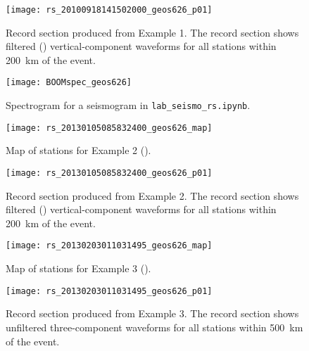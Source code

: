 \documentclass[11pt,titlepage,fleqn]{article}
\newcommand{\tfile}{{\tt lab\_seismo\_rs.ipynb}}
\begin{document}
\clearpage\pagebreak
\begin{figure}
\hspace{-1.25cm}
\texttt{[image: rs\_20100918141502000\_geos626\_p01]}
\caption[]
{{
Record section produced from Example 1.
The record section shows filtered () vertical-component waveforms for all stations within 200~km of the event.
}}
\label{fig:rs_ex01}
\end{figure}

\clearpage\pagebreak
\begin{figure}
\centering
\texttt{[image: BOOMspec\_geos626]}
\caption[]
{{
Spectrogram for a seismogram in \tfile.
}}
\label{fig:BOOM}
\end{figure}


\clearpage\pagebreak
\begin{figure}
\centering
\texttt{[image: rs\_20130105085832400\_geos626\_map]}
\caption[]
{{
Map of stations for Example 2 ().
}}
\label{fig:map_ex02}
\end{figure}

\clearpage\pagebreak
\begin{figure}
\hspace{-1.25cm}
\texttt{[image: rs\_20130105085832400\_geos626\_p01]}
\caption[]
{{
Record section produced from Example 2.
The record section shows filtered () vertical-component waveforms for all stations within 200~km of the event.
}}
\label{fig:rs_ex02}
\end{figure}


\clearpage\pagebreak
\begin{figure}
\centering
\texttt{[image: rs\_20130203011031495\_geos626\_map]}
\caption[]
{{
Map of stations for Example 3 ().
}}
\label{fig:map_ex03}
\end{figure}

\clearpage\pagebreak
\begin{figure}
\hspace{-1.25cm}
\texttt{[image: rs\_20130203011031495\_geos626\_p01]}
\caption[]
{{
Record section produced from Example 3.
The record section shows unfiltered three-component waveforms for all stations within 500~km of the event.
}}
\label{fig:rs_ex03}
\end{figure}

\end{document}
